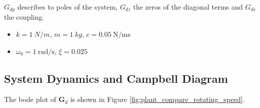 \documentclass{ISMA_USD2020}
\begin{document}
\(G_{dp}\) describes to poles of the system, \(G_{dz}\) the zeros of the diagonal terms and \(G_{dc}\) the coupling.

\begin{itemize}
\item \(k = \SI{1}{N/m}\), \(m = \SI{1}{kg}\), \(c = \SI{0.05}{\newton\per\meter\second}\)
\item \(\omega_0 = \SI{1}{\radian\per\second}\), \(\xi = 0.025\)
\end{itemize}

\subsection{System Dynamics and Campbell Diagram}
\label{sec:org42dee20}
The bode plot of \(\bm{G}_d\) is shown in Figure \ref{fig:plant_compare_rotating_speed}.
\end{document}
